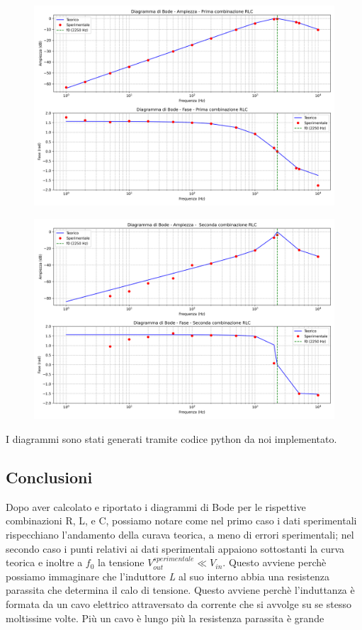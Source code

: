 \documentclass[a4paper,10pt]{article}
\begin{document}
 
\begin{figure}[H]
    \centering
    \includegraphics[width=0.7\linewidth]{figures/diagramma_bode_1.png}
\end{figure}
\noindent

\begin{figure}[H]
    \centering
    \includegraphics[width=0.7\linewidth]{figures/diagramma_bode_2.png}
\end{figure}
\noindent

I diagrammi sono stati generati tramite codice python da noi implementato.

\subsection{Conclusioni}
Dopo aver calcolato e riportato i diagrammi di Bode per le rispettive combinazioni R, L, e C, possiamo notare come nel primo caso i dati sperimentali rispecchiano l'andamento della curava teorica, a meno di errori sperimentali; nel secondo caso i punti relativi ai dati sperimentali appaiono sottostanti la curva teorica e inoltre a $f_0$ la tensione $V_{out}^{sperimentale} \ll V_{in}$. Questo avviene perchè possiamo immaginare che l'induttore \textit{L} al suo interno abbia una resistenza parassita che determina il calo di tensione. 
Questo avviene perchè l’induttanza è formata da un cavo elettrico attraversato da corrente che si avvolge su se stesso moltissime volte. Più un cavo è lungo più la resistenza parassita è grande
\end{document}
